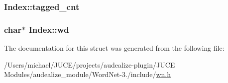\subsubsection[{\texorpdfstring{tagged\+\_\+cnt}{tagged_cnt}}]{ Index\+::tagged\+\_\+cnt}\hypertarget{struct_index_ad039685d966a205dfedc4de92469621c}{}\label{struct_index_ad039685d966a205dfedc4de92469621c}
\subsubsection[{\texorpdfstring{wd}{wd}}]{\setlength{\rightskip}{0pt plus 5cm}char$\ast$ Index\+::wd}\hypertarget{struct_index_ac836b68129dd28ed751e34b28701f6d2}{}\label{struct_index_ac836b68129dd28ed751e34b28701f6d2}


The documentation for this struct was generated from the following file\+:\begin{DoxyCompactItemize}
\item 
/\+Users/michael/\+J\+U\+C\+E/projects/audealize-\/plugin/\+J\+U\+C\+E Modules/audealize\+\_\+module/\+Word\+Net-\/3./include/\hyperlink{wn_8h}{wn.\+h}\end{DoxyCompactItemize}

